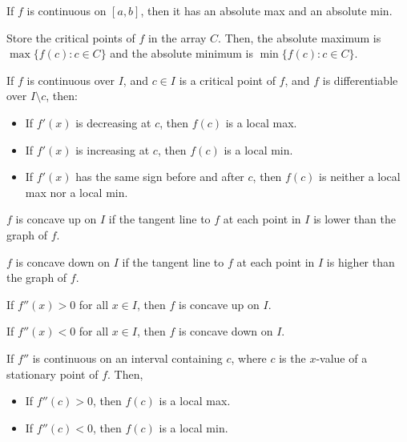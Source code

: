 \begin{namedtheorem}
  If $f$ is continuous on $[a, b]$, then it has an absolute max and an absolute min.
\end{namedtheorem}

\begin{theorem}
  Store the critical points of $f$ in the array $C$. Then, the absolute maximum is $\max \{f(c) : c \in C\}$ and the absolute minimum is $\min \{f(c) : c \in C\}$.
\end{theorem}

\begin{theorem}
  If $f$ is continuous over $I$, and $c \in I$ is a critical point of $f$, and $f$ is differentiable over $I \setminus {c}$, then:

  \begin{itemize}
    \item If $f'(x)$ is decreasing at $c$, then $f(c)$ is a local max.
    \item If $f'(x)$ is increasing at $c$, then $f(c)$ is a local min.
    \item If $f'(x)$ has the same sign before and after $c$, then $f(c)$ is neither a local max nor a local min.
  \end{itemize}
\end{theorem}

\begin{definition}[Concavity]
  $f$ is concave up on $I$ if the tangent line to $f$ at each point in $I$ is lower than the graph of $f$.

  $f$ is concave down on $I$ if the tangent line to $f$ at each point in $I$ is higher than the graph of $f$.
\end{definition}

\begin{theorem}
  If $f''(x) > 0$ for all $x \in I$, then $f$ is concave up on $I$.

  If $f''(x) < 0$ for all $x \in I$, then $f$ is concave down on $I$.
\end{theorem}

\begin{theorem}
  If $f''$ is continuous on an interval containing $c$, where $c$ is the $x$-value of a stationary point of $f$. Then,
  \begin{itemize}
    \item If $f''(c) > 0$, then $f(c)$ is a local max.
    \item If $f''(c) < 0$, then $f(c)$ is a local min.
  \end{itemize}
\end{theorem}

